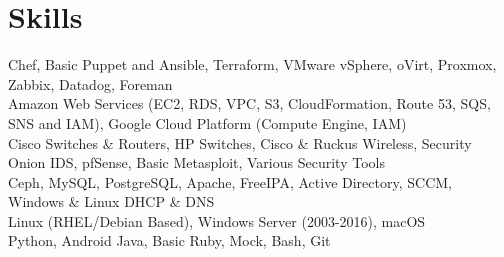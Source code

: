 \documentclass[]{deedy-resume-openfont}
\begin{document}
\begin{minipage}[t]{0.33\textwidth}
\section{Skills}
Chef, Basic Puppet and Ansible, Terraform, VMware vSphere, oVirt, Proxmox, Zabbix, Datadog, Foreman \\
\vspace{5pt}
Amazon Web Services (EC2, RDS, VPC, S3, CloudFormation, Route 53, SQS, SNS and IAM), Google Cloud Platform (Compute Engine, IAM) \\
\vspace{5pt}
Cisco Switches \& Routers, HP Switches, Cisco \& Ruckus Wireless, Security Onion IDS, pfSense, Basic Metasploit, Various Security Tools \\
\vspace{5pt}
Ceph, MySQL, PostgreSQL, Apache, FreeIPA, Active Directory, SCCM, Windows \& Linux DHCP \& DNS \\
\vspace{5pt}
Linux (RHEL/Debian Based), Windows Server (2003-2016), macOS \\
\vspace{5pt}
Python, Android Java, Basic Ruby, Mock, Bash, Git
\sectionsep

%
%

\end{minipage} 
\hfill
\end{document}
